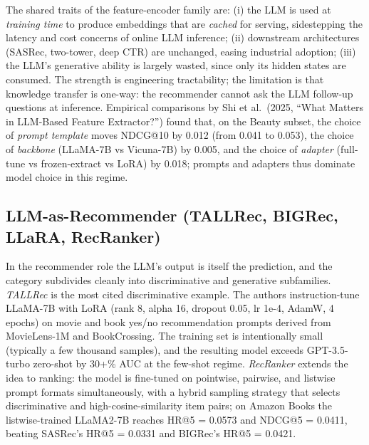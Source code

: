 \documentclass{article}
\begin{document}
The shared traits of the feature-encoder family are: (i) the LLM is used at \emph{training time} to produce embeddings that are \emph{cached} for serving, sidestepping the latency and cost concerns of online LLM inference; (ii) downstream architectures (SASRec, two-tower, deep CTR) are unchanged, easing industrial adoption; (iii) the LLM's generative ability is largely wasted, since only its hidden states are consumed. The strength is engineering tractability; the limitation is that knowledge transfer is one-way: the recommender cannot ask the LLM follow-up questions at inference. Empirical comparisons by Shi et al.~(2025, ``What Matters in LLM-Based Feature Extractor?'') found that, on the Beauty subset, the choice of \emph{prompt template} moves NDCG@10 by 0.012 (from 0.041 to 0.053), the choice of \emph{backbone} (LLaMA-7B vs Vicuna-7B) by 0.005, and the choice of \emph{adapter} (full-tune vs frozen-extract vs LoRA) by 0.018; prompts and adapters thus dominate model choice in this regime.

\subsection{LLM-as-Recommender (TALLRec, BIGRec, LLaRA, RecRanker)}\label{llm-as-recommender-tallrec-bigrec-llara-recranker}

In the recommender role the LLM's output is itself the prediction, and the category subdivides cleanly into discriminative and generative subfamilies. \emph{TALLRec} \citep{bao2023arxiv2305004472023} is the most cited discriminative example. The authors instruction-tune LLaMA-7B with LoRA (rank 8, alpha 16, dropout 0.05, lr 1e-4, AdamW, 4 epochs) on movie and book yes/no recommendation prompts derived from MovieLens-1M and BookCrossing. The training set is intentionally small (typically a few thousand samples), and the resulting model exceeds GPT-3.5-turbo zero-shot by 30+\% AUC at the few-shot regime. \emph{RecRanker} \citep{luo2024recrankerinstructi} extends the idea to ranking: the model is fine-tuned on pointwise, pairwise, and listwise prompt formats simultaneously, with a hybrid sampling strategy that selects discriminative and high-cosine-similarity item pairs; on Amazon Books the listwise-trained LLaMA2-7B reaches HR@5 = 0.0573 and NDCG@5 = 0.0411, beating SASRec's HR@5 = 0.0331 and BIGRec's HR@5 = 0.0421.
\end{document}
